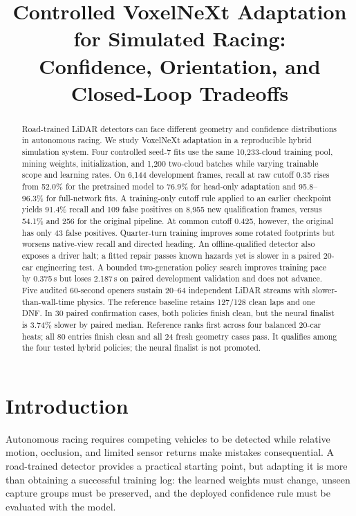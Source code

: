 \documentclass[conference]{IEEEtran}
\title{Controlled VoxelNeXt Adaptation for Simulated Racing:\\Confidence, Orientation, and Closed-Loop Tradeoffs}
\author{\IEEEauthorblockN{Bradley Yong}
\IEEEauthorblockA{Blue Galaxy Racing \quad CMPE249, San Jos\'e State University\\
\footnotesize \href{https://github.com/j1s3ng/lidar-racing}{Public source repository} \quad \href{https://github.com/j1s3ng/lidar-racing/blob/main/docs/LiDAR_Racing_Demo.mp4}{112-second demo (external hosting pending)}.\\
\footnotesize Source-verified 73-case study, evidence through \ResultCutoff.\\
\footnotesize The course-required YouTube/Drive video link remains pending.}}
\begin{document}
\maketitle

\begin{abstract}
Road-trained LiDAR detectors can face different geometry and confidence distributions in autonomous racing. We study VoxelNeXt adaptation in a reproducible hybrid simulation system. Four controlled seed-7 fits use the same 10,233-cloud training pool, mining weights, initialization, and 1,200 two-cloud batches while varying trainable scope and learning rates. On 6,144 development frames, recall at raw cutoff 0.35 rises from 52.0\% for the pretrained model to 76.9\% for head-only adaptation and 95.8--96.3\% for full-network fits. A training-only cutoff rule applied to an earlier checkpoint yields 91.4\% recall and 109 false positives on 8,955 new qualification frames, versus 54.1\% and 256 for the original pipeline. At common cutoff 0.425, however, the original has only 43 false positives. Quarter-turn training improves some rotated footprints but worsens native-view recall and directed heading. An offline-qualified detector also exposes a driver halt; a fitted repair passes known hazards yet is slower in a paired 20-car engineering test. A bounded two-generation policy search improves training pace by 0.375\,s but loses 2.187\,s on paired development validation and does not advance. Five audited 60-second openers sustain 20--64 independent LiDAR streams with slower-than-wall-time physics. The reference baseline retains 127/128 clean laps and one DNF. In 30 paired confirmation cases, both policies finish clean, but the neural finalist is 3.74\% slower by paired median. Reference ranks first across four balanced 20-car heats; all 80 entries finish clean and all 24 fresh geometry cases pass. It qualifies among the four tested hybrid policies; the neural finalist is not promoted.
\end{abstract}

\section{Introduction}
Autonomous racing requires competing vehicles to be detected while relative motion, occlusion, and limited sensor returns make mistakes consequential. A road-trained detector provides a practical starting point, but adapting it is more than obtaining a successful training log: the learned weights must change, unseen capture groups must be preserved, and the deployed confidence rule must be evaluated with the model.
\end{document}
